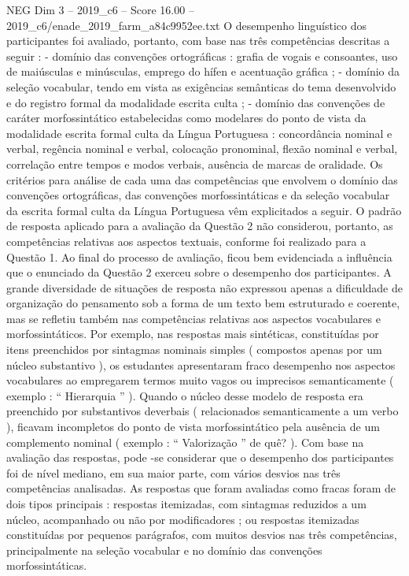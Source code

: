 \begin{textsample}{NEG Dim 3 – 2019\_c6 – Score 16.00 – 2019\_c6/enade\_2019\_farm\_a84c9952ee.txt}
O desempenho linguístico dos participantes foi avaliado, portanto, com base nas três competências descritas a seguir : - domínio das convenções ortográficas : grafia de vogais e consoantes, uso de maiúsculas e minúsculas, emprego do hífen e acentuação gráfica ; - domínio da seleção vocabular, tendo em vista as exigências semânticas do tema desenvolvido e do registro formal da modalidade escrita culta ; - domínio das convenções de caráter morfossintático estabelecidas como modelares do ponto de vista da modalidade escrita formal culta da Língua Portuguesa : concordância nominal e verbal, regência nominal e verbal, colocação pronominal, flexão nominal e verbal, correlação entre tempos e modos verbais, ausência de marcas de oralidade.
Os critérios para análise de cada uma das competências que envolvem o domínio das convenções ortográficas, das convenções morfossintáticas e da seleção vocabular da escrita formal culta da Língua Portuguesa vêm explicitados a seguir.
O padrão de resposta aplicado para a avaliação da Questão 2 não considerou, portanto, as competências relativas aos aspectos textuais, conforme foi realizado para a Questão 1.
Ao final do processo de avaliação, ficou bem evidenciada a influência que o enunciado da Questão 2 exerceu sobre o desempenho dos participantes.
A grande diversidade de situações de resposta não expressou apenas a dificuldade de organização do pensamento sob a forma de um texto bem estruturado e coerente, mas se refletiu também nas competências relativas aos aspectos vocabulares e morfossintáticos.
Por exemplo, nas respostas mais sintéticas, constituídas por itens preenchidos por sintagmas nominais simples ( compostos apenas por um núcleo substantivo ), os estudantes apresentaram fraco desempenho nos aspectos vocabulares ao empregarem termos muito vagos ou imprecisos semanticamente ( exemplo : “ Hierarquia ” ).
Quando o núcleo desse modelo de resposta era preenchido por substantivos deverbais ( relacionados semanticamente a um verbo ), ficavam incompletos do ponto de vista morfossintático pela ausência de um complemento nominal ( exemplo : “ Valorização ” de quê? ).
Com base na avaliação das respostas, pode -se considerar que o desempenho dos participantes foi de nível mediano, em sua maior parte, com vários desvios nas três competências analisadas.
As respostas que foram avaliadas como fracas foram de dois tipos principais : respostas itemizadas, com sintagmas reduzidos a um núcleo, acompanhado ou não por modificadores ; ou respostas itemizadas constituídas por pequenos parágrafos, com muitos desvios nas três competências, principalmente na seleção vocabular e no domínio das convenções morfossintáticas.

\end{textsample}
